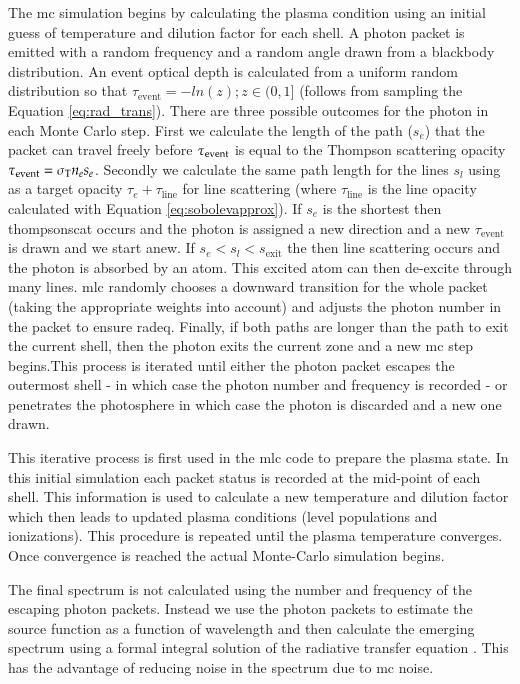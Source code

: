 The \gls{mc} simulation begins by calculating the plasma condition using an initial guess of temperature and dilution factor for each shell. A photon packet is emitted with a random frequency and a random angle drawn from a blackbody distribution.  An event optical depth is calculated from a uniform random distribution so that $\tau_\textrm{event}=-ln(z); z \in (0,1]$ (follows from sampling the Equation \ref{eq:rad_trans}).  There are three possible outcomes for the photon in each Monte Carlo step. First we calculate the length of the path ($s_e$) that the packet can travel freely before $\tau_{\rm event}$ is equal to the Thompson scattering opacity $\tau_{\rm event} = \sigma_\textrm{T} n_e s_e$. Secondly we calculate the same path length for the lines $s_l$ using as a target opacity $\tau_e + \tau_\textrm{line}$ for line scattering (where $\tau_\textrm{line}$ is the line opacity calculated with Equation \ref{eq:sobolevapprox}). If $s_e$ is the shortest then \gls{thompsonscat} occurs and the photon is assigned a new direction and a new $\tau_\textrm{event}$ is drawn and we start anew.  If $s_e<s_l<s_\textrm{exit}$ the then line scattering occurs and the photon is absorbed by an atom. This excited atom can then de-excite through many lines. \gls{mlc} randomly chooses a downward transition for the whole packet (taking the appropriate weights into account) and adjusts the photon number in the packet to ensure \gls{radeq}.  Finally, if both paths are longer than the path to exit the current shell, then the photon exits the current zone and a new \gls{mc} step begins.This process is iterated until either the photon packet escapes the outermost shell - in which case the photon number and frequency is recorded - or penetrates the photosphere in which case the photon is discarded and a new one drawn. 

This iterative process is first used in the \gls{mlc} code to prepare the plasma state. In this initial simulation each packet status is recorded at the mid-point of each shell. This information is used to calculate a new temperature and dilution factor which then leads to updated plasma conditions (level populations and ionizations). This procedure is repeated until the plasma temperature converges. Once convergence is reached the actual Monte-Carlo simulation begins. 

The final spectrum is not calculated using the number and frequency of the escaping photon packets. Instead we use the photon packets to estimate the source function as a function of wavelength and then calculate the emerging spectrum using a formal integral solution of the radiative transfer equation \citep[a more detailed description of this method in][]{2000A&A...363..705M}. This has the advantage of reducing noise in the spectrum due to \gls{mc} noise. 


